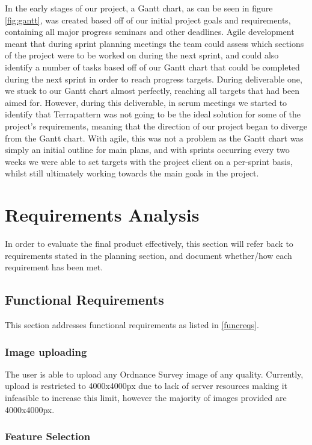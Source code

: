 In the early stages of our project, a Gantt chart, as can be seen in figure \ref{fig:gantt}, was created based off of our initial project goals and requirements, containing all major progress seminars and other deadlines. Agile development meant that during sprint planning meetings the team could assess which sections of the project were to be worked on during the next sprint, and could also identify a number of tasks based off of our Gantt chart that could be completed during the next sprint in order to reach progress targets. During deliverable one, we stuck to our Gantt chart almost perfectly, reaching all targets that had been aimed for. However, during this deliverable, in scrum meetings we started to identify that Terrapattern was not going to be the ideal solution for some of the project’s requirements, meaning that the direction of our project began to diverge from the Gantt chart. With agile, this was not a problem as the Gantt chart was simply an initial outline for main plans, and with sprints occurring every two weeks we were able to set targets with the project client on a per-sprint basis, whilst still ultimately working towards the main goals in the project.

\section{Requirements Analysis}
In order to evaluate the final product effectively, this section will refer back to requirements stated in the planning section, and document whether/how each requirement has been met.

\subsection{Functional Requirements}

This section addresses functional requirements as listed in \ref{funcreqs}.

\subsubsection{Image uploading}
The user is able to upload any Ordnance Survey image of any quality. Currently, upload is restricted to 4000x4000px due to lack of server resources making it infeasible to increase this limit, however the majority of images provided are 4000x4000px.

\subsubsection{Feature Selection}

